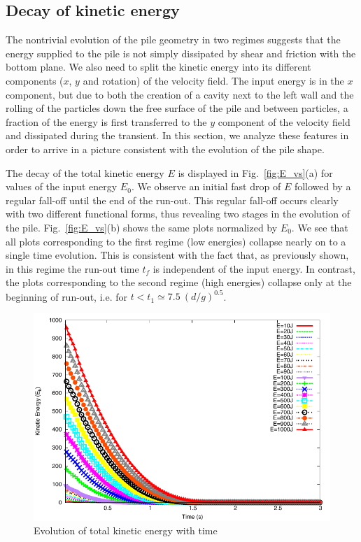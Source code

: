 \subsection{Decay of kinetic energy}
\label{sec:decay}

The nontrivial evolution of the pile geometry  in two regimes suggests that the 
energy supplied to the pile is not simply dissipated by shear and friction with 
the bottom plane. We also need to split the kinetic energy into its different 
components ($x$, $y$ and rotation) of the velocity field. The input energy 
is in the $x$ component, but due to both the creation of a cavity next to the 
left wall and the rolling of the particles down the free surface of the pile 
and between particles, a fraction of the energy is first transferred to the $y$ 
component of the velocity field and dissipated  during the transient. 
In this section, we analyze these features  in order to arrive in a picture 
consistent with the evolution of the pile shape.  

The decay of the total kinetic energy $E$ is displayed in 
Fig.~\ref{fig:E_vs}(a) for values of the input energy $E_0$. We observe an 
initial fast drop of $E$ followed by a regular fall-off until the end of the 
run-out. This regular fall-off occurs clearly with two different functional 
forms, thus revealing two stages in the evolution of the pile. 
Fig.~\ref{fig:E_vs}(b) shows the same plots normalized by $E_0$. We see that 
all plots corresponding to the first regime (low energies) collapse nearly on 
to a single time evolution. 
This is consistent with the fact that, as previously shown, in this 
regime the run-out time $t_f$ is independent of the input energy. In contrast, 
the plots corresponding to the second regime (high energies) collapse only at 
the beginning of run-out, i.e. for $t < t_1 \simeq 7.5 \ (d/g)^{0.5}$.   

\begin{figure}[tbhp]
\centering
\includegraphics[width=\textwidth]{Energy_Slope}
\caption{Evolution of total kinetic energy with time}
\label{fig:energy_slope}
\end{figure}

